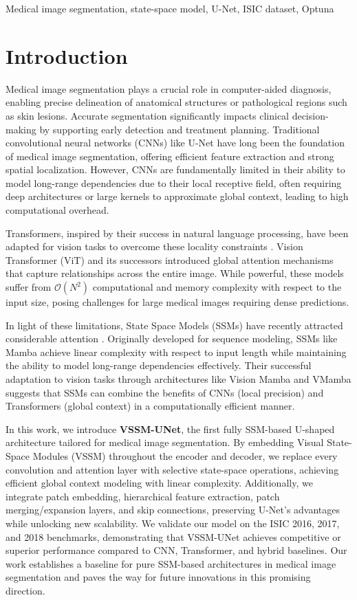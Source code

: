 \documentclass[conference]{IEEEtran}
\begin{document}
\begin{IEEEkeywords}
Medical image segmentation, state-space model, U-Net, ISIC dataset, Optuna
\end{IEEEkeywords}

\section{Introduction}
Medical image segmentation plays a crucial role in computer-aided diagnosis, enabling precise delineation of anatomical structures or pathological regions such as skin lesions. Accurate segmentation significantly impacts clinical decision-making by supporting early detection and treatment planning. Traditional convolutional neural networks (CNNs) like U-Net \cite{ronneberger2015} have long been the foundation of medical image segmentation, offering efficient feature extraction and strong spatial localization. However, CNNs are fundamentally limited in their ability to model long-range dependencies due to their local receptive field, often requiring deep architectures or large kernels to approximate global context, leading to high computational overhead.

Transformers, inspired by their success in natural language processing, have been adapted for vision tasks to overcome these locality constraints \cite{chen2021}. Vision Transformer (ViT) and its successors introduced global attention mechanisms that capture relationships across the entire image. While powerful, these models suffer from \(\mathcal{O}(N^2)\) computational and memory complexity with respect to the input size, posing challenges for large medical images requiring dense predictions.

In light of these limitations, State Space Models (SSMs) have recently attracted considerable attention \cite{gu2023}. Originally developed for sequence modeling, SSMs like Mamba achieve linear complexity with respect to input length while maintaining the ability to model long-range dependencies effectively. Their successful adaptation to vision tasks through architectures like Vision Mamba and VMamba \cite{liu2024} suggests that SSMs can combine the benefits of CNNs (local precision) and Transformers (global context) in a computationally efficient manner.

In this work, we introduce \textbf{VSSM-UNet}, the first fully SSM-based U-shaped architecture tailored for medical image segmentation. By embedding Visual State-Space Modules (VSSM) throughout the encoder and decoder, we replace every convolution and attention layer with selective state-space operations, achieving efficient global context modeling with linear complexity. Additionally, we integrate patch embedding, hierarchical feature extraction, patch merging/expansion layers, and skip connections, preserving U-Net’s advantages while unlocking new scalability. We validate our model on the ISIC 2016, 2017, and 2018 benchmarks, demonstrating that VSSM-UNet achieves competitive or superior performance compared to CNN, Transformer, and hybrid baselines. Our work establishes a baseline for pure SSM-based architectures in medical image segmentation and paves the way for future innovations in this promising direction.
\end{document}

